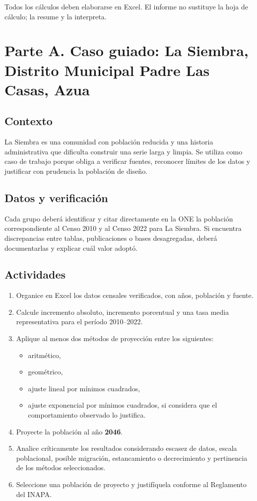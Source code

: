 \documentclass[11pt]{scrartcl}
\begin{document}
\begin{icvwarning}[Entrega]
Todos los cálculos deben elaborarse en Excel. El informe no sustituye la
hoja de cálculo; la resume y la interpreta.
\end{icvwarning}

\section{Parte A. Caso guiado: La Siembra, Distrito Municipal Padre Las Casas, Azua}

\subsection{Contexto}
La Siembra es una comunidad con población reducida y una historia
administrativa que dificulta construir una serie larga y limpia. Se
utiliza como caso de trabajo porque obliga a verificar fuentes,
reconocer límites de los datos y justificar con prudencia la población
de diseño.

\subsection{Datos y verificación}
Cada grupo deberá identificar y citar directamente en la ONE la
población correspondiente al Censo 2010 y al Censo 2022 para La
Siembra. Si encuentra discrepancias entre tablas, publicaciones o bases
desagregadas, deberá documentarlas y explicar cuál valor adoptó.

\subsection{Actividades}
\begin{enumerate}
  \item Organice en Excel los datos censales verificados, con años,
    población y fuente.
  \item Calcule incremento absoluto, incremento porcentual y una tasa
    media representativa para el período 2010--2022.
  \item Aplique al menos dos métodos de proyección entre los
    siguientes:
    \begin{itemize}
      \item aritmético,
      \item geométrico,
      \item ajuste lineal por mínimos cuadrados,
      \item ajuste exponencial por mínimos cuadrados, si considera
        que el comportamiento observado lo justifica.
    \end{itemize}
  \item Proyecte la población al año \textbf{2046}.
  \item Analice críticamente los resultados considerando escasez de
    datos, escala poblacional, posible migración, estancamiento o
    decrecimiento y pertinencia de los métodos seleccionados.
  \item Seleccione una población de proyecto y justifíquela conforme al
    Reglamento del INAPA.
\end{enumerate}
\end{document}

